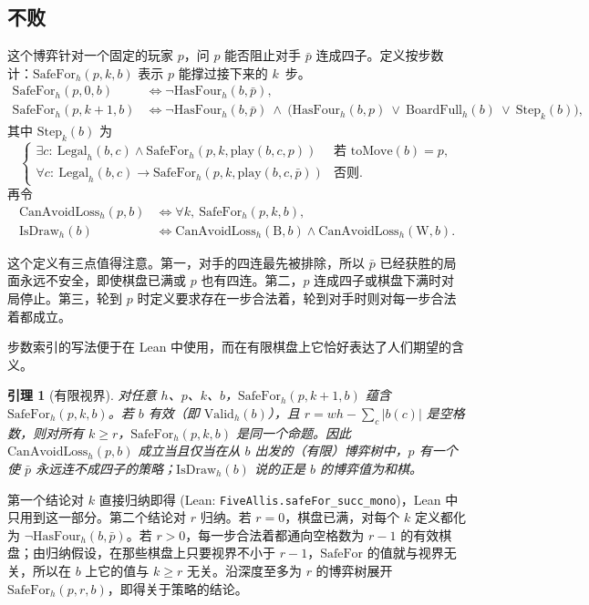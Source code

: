 \documentclass[11pt,a4paper]{article}
\makeatletter
\theoremstyle{zhthm}
\newtheorem{lemma}[theorem]{引理}
\renewcommand{\proofname}{证明}
\renewenvironment{proof}[1][\proofname]{\par\pushQED{\qed}\normalfont
  \topsep6\p@\@plus6\p@\relax\trivlist\item[\hskip\labelsep\bfseries #1]\hspace{1em}\ignorespaces}
  {\popQED\endtrivlist\@endpefalse}
\newcommand{\code}[1]{{\upshape\texttt{\small\nolinkurl{#1}}}}
\newcommand{\leanref}[1]{(Lean: \code{#1})}
\newcommand{\B}{\mathrm{B}}
\newcommand{\W}{\mathrm{W}}
\newcommand{\IsDraw}{\mathrm{IsDraw}}
\newcommand{\SafeFor}{\mathrm{SafeFor}}
\newcommand{\CanAvoidLoss}{\mathrm{CanAvoidLoss}}
\newcommand{\HasFour}{\mathrm{HasFour}}
\makeatother
\begin{document}
\subsection{不败}

这个博弈针对一个固定的玩家 $p$，问 $p$ 能否阻止对手 $\bar p$ 连成四子。定义按步数计：$\SafeFor_h(p,k,b)$ 表示 $p$ 能撑过接下来的 $k$~步。
\begin{align*}
  \SafeFor_h(p,0,b) &\iff \neg\HasFour_h(b,\bar p),\\
  \SafeFor_h(p,k{+}1,b) &\iff \neg\HasFour_h(b,\bar p)\ \wedge\ \bigl(\HasFour_h(b,p)\ \vee\ \mathrm{BoardFull}_h(b)\ \vee\ \mathrm{Step}_k(b)\bigr),
\end{align*}
其中 $\mathrm{Step}_k(b)$ 为
\[
  \begin{cases}
    \exists c:\ \mathrm{Legal}_h(b,c)\wedge \SafeFor_h(p,k,\mathrm{play}(b,c,p)) & \text{若 } \mathrm{toMove}(b)=p,\\
    \forall c:\ \mathrm{Legal}_h(b,c)\to \SafeFor_h(p,k,\mathrm{play}(b,c,\bar p)) & \text{否则}.
  \end{cases}
\]
再令
\begin{align*}
  \CanAvoidLoss_h(p,b) &\iff \forall k,\ \SafeFor_h(p,k,b),\\
  \IsDraw_h(b) &\iff \CanAvoidLoss_h(\B,b)\wedge \CanAvoidLoss_h(\W,b).
\end{align*}

这个定义有三点值得注意。第一，对手的四连最先被排除，所以 $\bar p$ 已经获胜的局面永远不安全，即使棋盘已满或 $p$ 也有四连。第二，$p$ 连成四子或棋盘下满时对局停止。第三，轮到 $p$ 时定义要求存在一步合法着，轮到对手时则对每一步合法着都成立。

步数索引的写法便于在 Lean 中使用，而在有限棋盘上它恰好表达了人们期望的含义。

\begin{lemma}[有限视界]
\label{lem:finite-horizon}
对任意 $h$、$p$、$k$、$b$，$\SafeFor_h(p,k{+}1,b)$ 蕴含 $\SafeFor_h(p,k,b)$。若 $b$ 有效（即 $\mathrm{Valid}_h(b)$），且 $r=wh-\sum_c|b(c)|$ 是空格数，则对所有 $k\ge r$，$\SafeFor_h(p,k,b)$ 是同一个命题。因此 $\CanAvoidLoss_h(p,b)$ 成立当且仅当在从 $b$ 出发的（有限）博弈树中，$p$ 有一个使 $\bar p$ 永远连不成四子的策略；$\IsDraw_h(b)$ 说的正是 $b$ 的博弈值为和棋。
\end{lemma}

\begin{proof}
第一个结论对 $k$ 直接归纳即得 \leanref{FiveAllis.safeFor_succ_mono}，Lean 中只用到这一部分。第二个结论对 $r$ 归纳。若 $r=0$，棋盘已满，对每个 $k$ 定义都化为 $\neg\HasFour_h(b,\bar p)$。若 $r>0$，每一步合法着都通向空格数为 $r-1$ 的有效棋盘；由归纳假设，在那些棋盘上只要视界不小于 $r-1$，$\SafeFor$ 的值就与视界无关，所以在 $b$ 上它的值与 $k\ge r$ 无关。沿深度至多为 $r$ 的博弈树展开 $\SafeFor_h(p,r,b)$，即得关于策略的结论。
\end{proof}
\end{document}
